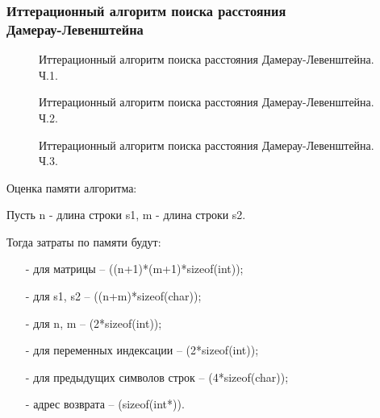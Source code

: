 \subsubsection{Иттерационный алгоритм поиска расстояния\\ Дамерау-Левенштейна}
\begin{figure}[!h]
	\centering
	\captionsetup{justification=centering}
    \def\svgscale{0.75}
	
	\caption{Иттерационный алгоритм поиска расстояния Дамерау-Левенштейна. Ч.1.}
	\label{fig:d21}
\end{figure}
\begin{figure}[h]
	\centering
	\captionsetup{justification=centering}
    \def\svgscale{0.75}
	
	\caption{Иттерационный алгоритм поиска расстояния Дамерау-Левенштейна. Ч.2.}
	\label{fig:d22}
\end{figure}
\begin{figure}[!h]
	\centering
	\captionsetup{justification=centering}
    \def\svgscale{0.7}
	
	\caption{Иттерационный алгоритм поиска расстояния Дамерау-Левенштейна. Ч.3.}
	\label{fig:d23}
\end{figure}
\pagebreak


Оценка памяти алгоритма:\par
Пусть n - длина строки s1, m - длина строки s2.\par
Тогда затраты по памяти будут:\par
\begin{itemize}
	\item[-] для матрицы -- ((n+1)*(m+1)*sizeof(int));
	\item[-] для s1, s2 -- ((n+m)*sizeof(char));
	\item[-] для n, m -- (2*sizeof(int));
	\item[-] для переменных индексации -- (2*sizeof(int));
	\item[-] для предыдущих символов строк -- (4*sizeof(char));
	\item[-] адрес возврата -- (sizeof(int*)).
\end{itemize}
\pagebreak

